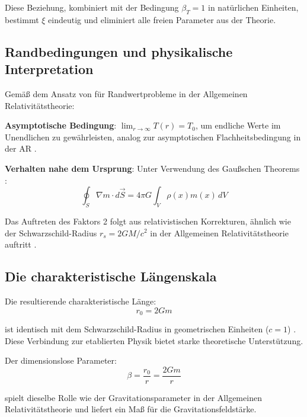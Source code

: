 \documentclass[12pt,a4paper]{article}
\begin{document}
Diese Beziehung, kombiniert mit der Bedingung $\beta_T = 1$ in natürlichen Einheiten, bestimmt $\xi$ eindeutig und eliminiert alle freien Parameter aus der Theorie.
	\subsection{Randbedingungen und physikalische Interpretation}
	\label{subsec:boundary_conditions}
	
	Gemäß dem Ansatz von \citet{misner1973} für Randwertprobleme in der Allgemeinen Relativitätstheorie:
	
	\textbf{Asymptotische Bedingung}: $\lim_{r \to \infty} T(r) = T_0$, um endliche Werte im Unendlichen zu gewährleisten, analog zur asymptotischen Flachheitsbedingung in der AR \citep{carroll2004}.
	
	\textbf{Verhalten nahe dem Ursprung}: Unter Verwendung des Gaußschen Theorems \citep{griffiths1999,jackson1998}:
	\begin{equation}
		\oint_S \nabla m \cdot d\vec{S} = 4\pi G \int_V \rho(x) m(x) \, dV
	\end{equation}
	
	Das Auftreten des Faktors 2 folgt aus relativistischen Korrekturen, ähnlich wie der Schwarzschild-Radius $r_s = 2GM/c^2$ in der Allgemeinen Relativitätstheorie auftritt \citep{schwarzschild1916,misner1973}.
	
	\subsection{Die charakteristische Längenskala}
	\label{subsec:characteristic_length}
	
	Die resultierende charakteristische Länge:
	\begin{equation}
		\boxed{r_0 = 2Gm}
	\end{equation}
	
	ist identisch mit dem Schwarzschild-Radius in geometrischen Einheiten ($c = 1$) \citep{misner1973,carroll2004}. Diese Verbindung zur etablierten Physik bietet starke theoretische Unterstützung.
	
	Der dimensionslose Parameter:
	\begin{equation}
		\boxed{\beta = \frac{r_0}{r} = \frac{2Gm}{r}}
	\end{equation}
	
	spielt dieselbe Rolle wie der Gravitationsparameter in der Allgemeinen Relativitätstheorie \citep{weinberg1972} und liefert ein Maß für die Gravitationsfeldstärke.
	
\end{document}
